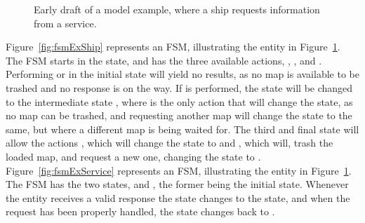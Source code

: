 \begin{figure}[h!]
  \centering
  \caption{Early draft of a model example, where a ship requests information from a service.}
  \label{fig:modelExProtocol}
\end{figure}
\noindent
Figure~\ref{fig:fsmExShip} represents an FSM, illustrating the  entity in Figure~\ref{fig:modelExProtocol}. The FSM starts in the  state, and has the three available actions, , , and . Performing  or  in the initial state will yield no results, as no map is available to be trashed and no response is on the way. If  is performed, the state will be changed to the intermediate state , where  is the only action that will change the state, as no map can be trashed, and requesting another map will change the state to the same, but where a different map is being waited for. The third and final state  will allow the actions , which will change the state to  and , which will, trash the loaded map, and request a new one, changing the state to .
\newpage
\noindent
Figure~\ref{fig:fsmExService} represents an FSM, illustrating the  entity in Figure~\ref{fig:modelExProtocol}. The FSM has the two states,  and , the former being the initial state. Whenever the entity receives a valid response the state changes to the  state, and when the request has been properly handled, the state changes back to .
